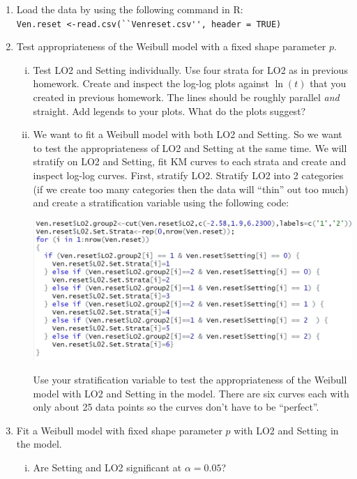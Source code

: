 \documentclass[12pt]{article}
\begin{document}
\begin{enumerate}[1.]
\item Load the data by using the following command in R: \\
 \lstinline{Ven.reset <-read.csv(``Venreset.csv'', header = TRUE)}

\item Test appropriateness of the Weibull model with a fixed shape parameter $p$. 
\begin{enumerate}[i.]
\item Test LO2 and Setting individually. Use four strata for LO2 as in previous homework. Create and inspect the log-log plots against $\ln(t)$ that you created in previous homework. The lines should be roughly parallel \textit{and} straight. Add legends to your plots. What do the plots suggest?
\item We want to fit a Weibull model with both LO2 and Setting. So we want to test the appropriateness of LO2 and Setting at the same time. We will stratify on LO2 and Setting, fit KM curves to each strata and create and inspect log-log curves. First, stratify LO2. Stratify LO2 into 2 categories (if we create too many categories then the data will ``thin'' out too much) and create a stratification variable using the following code:
 \begin{center}
\includegraphics[scale=.5]{HW5code.JPG}
\end{center}
Use your stratification variable to test the appropriateness of the Weibull model with LO2 and Setting in the model. There are six curves each with only about 25 data points so the curves don't have to be ``perfect''.   
\end{enumerate} 
\item Fit a Weibull model with fixed shape parameter $p$ with LO2 and Setting in the model.  
\begin{enumerate}[i.] 
\item Are Setting and LO2 significant at $\alpha=0.05$? 

\end{enumerate}
\end{enumerate}
\end{document}
